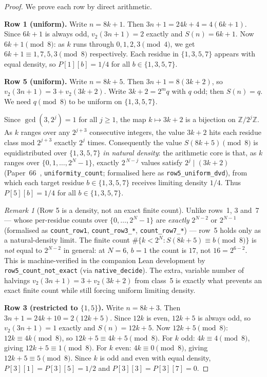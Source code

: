 \documentclass[12pt]{article}
\theoremstyle{definition}
\theoremstyle{remark}
\newtheorem{remark}[theorem]{Remark}
\newcommand{\vt}{v_2}
\newcommand{\Sm}{S}
\begin{document}
\begin{proof}
We prove each row by direct arithmetic.

\medskip\noindent
\textbf{Row 1 (uniform).}
Write $n = 8k+1$. Then $3n+1 = 24k+4 = 4(6k+1)$.
Since $6k+1$ is always odd, $\vt(3n+1) = 2$ exactly and $\Sm(n) = 6k+1$.
Now $6k+1 \pmod 8$: as $k$ runs through $0,1,2,3 \pmod 4$, we get
$6k+1 \equiv 1,7,5,3 \pmod 8$ respectively.
Each residue in $\{1,3,5,7\}$ appears with equal density, so $P[1][b] = 1/4$
for all $b \in \{1,3,5,7\}$.

\medskip\noindent
\textbf{Row 5 (uniform).}
Write $n = 8k+5$. Then $3n+1 = 8(3k+2)$, so $\vt(3n+1) = 3 + \vt(3k+2)$.
Write $3k+2 = 2^m q$ with $q$ odd; then $\Sm(n) = q$.
We need $q \pmod 8$ to be uniform on $\{1,3,5,7\}$.

Since $\gcd(3, 2^j) = 1$ for all $j \geq 1$, the map $k \mapsto 3k+2$ is
a bijection on $\mathbb{Z}/2^j\mathbb{Z}$.
As $k$ ranges over any $2^{j+3}$ consecutive integers, the value $3k+2$
hits each residue class mod $2^{j+3}$ exactly $2^j$ times.
Consequently the value $\Sm(8k+5) \pmod 8$ is equidistributed over
$\{1,3,5,7\}$ \emph{in natural density}: the arithmetic core is that, as $k$
ranges over $\{0,1,\ldots,2^N-1\}$, exactly $2^{\,N-j}$ values satisfy
$2^j \mid (3k+2)$ (Paper~66~\cite{paper66}, \texttt{uniformity\_count};
formalised here as \texttt{row5\_uniform\_dvd}), from which each target residue
$b \in \{1,3,5,7\}$ receives limiting density $1/4$.
Thus $P[5][b] = 1/4$ for all $b \in \{1,3,5,7\}$.

\begin{remark}[Row 5 is a density, not an exact finite count]
Unlike rows~1, 3 and~7 --- whose per-residue counts over $\{0,\ldots,2^N-1\}$
are \emph{exactly} $2^{N-2}$ or $2^{N-1}$ (formalised as \texttt{count\_row1},
\texttt{count\_row3\_*}, \texttt{count\_row7\_*}) --- row~5 holds only as a
natural-density limit.  The finite count
$\#\{k < 2^N : \Sm(8k+5) \equiv b \pmod 8\}$ is \emph{not} equal to $2^{N-2}$
in general: at $N=6$, $b=1$ the count is $17$, not $16 = 2^{6-2}$.  This is
machine-verified in the companion Lean development by
\texttt{row5\_count\_not\_exact} (via \texttt{native\_decide}).  The extra,
variable number of halvings $\vt(3n+1) = 3 + \vt(3k+2)$ from class~5 is exactly
what prevents an exact finite count while still forcing uniform limiting
density.
\end{remark}

\medskip\noindent
\textbf{Row 3 (restricted to $\{1, 5\}$).}
Write $n = 8k+3$. Then $3n+1 = 24k+10 = 2(12k+5)$.
Since $12k$ is even, $12k+5$ is always odd, so $\vt(3n+1) = 1$ exactly
and $\Sm(n) = 12k+5$.
Now $12k+5 \pmod 8$: $12k \equiv 4k \pmod 8$, so $12k+5 \equiv 4k+5 \pmod 8$.
For $k$ odd: $4k \equiv 4 \pmod 8$, giving $12k+5 \equiv 1 \pmod 8$.
For $k$ even: $4k \equiv 0 \pmod 8$, giving $12k+5 \equiv 5 \pmod 8$.
Since $k$ is odd and even with equal density, $P[3][1] = P[3][5] = 1/2$
and $P[3][3] = P[3][7] = 0$.


\end{proof}
\end{document}

